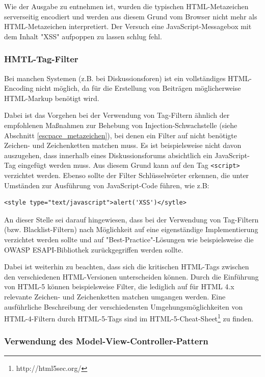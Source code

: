 Wie der Ausgabe zu entnehmen ist, wurden die typischen HTML-Metazeichen serverseitig encodiert und werden aus diesem Grund vom Browser nicht mehr als HTML-Metazeichen interpretiert. Der Versuch eine JavaScript-Messagebox mit dem Inhalt "XSS" aufpoppen zu lassen schlug fehl.

\subsubsection{HMTL-Tag-Filter}

Bei manchen Systemen (z.B. bei Diskussionsforen) ist ein vollständiges HTML-Encoding nicht möglich, da für die Erstellung von Beiträgen möglicherweise HTML-Markup benötigt wird. 

Dabei ist das Vorgehen bei der Verwendung von Tag-Filtern ähnlich der empfohlenen Maßnahmen zur Behebung von Injection-Schwachstelle (siehe Abschnitt \ref{escpace_metazeichen}), bei denen ein Filter auf nicht benötigte Zeichen- und Zeichenketten matchen muss. Es ist beispielsweise nicht davon auszugehen, dass innerhalb eines Diskussionsforums absichtlich ein JavaScript-Tag eingefügt werden muss. Aus diesem Grund kann auf den Tag \texttt{<script>} verzichtet werden. Ebenso sollte der Filter Schlüsselwörter erkennen, die unter Umständen zur Ausführung von JavaScript-Code führen, wie z.B:

\begin{lstlisting}[basicstyle=\ttfamily\footnotesize]
<style type="text/javascript">alert('XSS')</sytle>
\end{lstlisting}

An dieser Stelle sei darauf hingewiesen, dass bei der Verwendung von Tag-Filtern (bzw. Blacklist-Filtern) nach Möglichkeit auf eine eigenständige Implementierung verzichtet werden sollte und auf "Best-Practice"-Lösungen wie beispielsweise die OWASP ESAPI-Bibliothek zurückgegriffen werden sollte.

Dabei ist weiterhin zu beachten, dass sich die kritischen HTML-Tags zwischen den verschiedenen HTML-Versionen unterscheiden können. Durch die Einführung von HTML-5 können beispielsweise Filter, die lediglich auf für HTML 4.x relevante Zeichen- und Zeichenketten matchen umgangen werden. Eine ausführliche Beschreibung der verschiedensten Umgehungsmöglichkeiten von HTML-4-Filtern durch HTML-5-Tags sind im HTML-5-Cheat-Sheet\footnote{http://html5sec.org/} zu finden.

\subsubsection{Verwendung des Model-View-Controller-Pattern}


